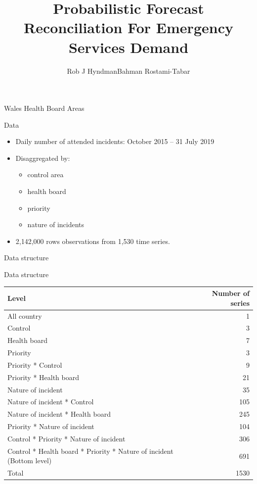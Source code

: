 \documentclass[
  14pt,
  ignorenonframetext,
  aspectratio=169,
]{beamer}
\title{Probabilistic Forecast Reconciliation For Emergency Services
Demand}
\author{Rob J Hyndman\newline Bahman Rostami-Tabar}
\date{}
\providecommand{\tightlist}{%
  \setlength{\itemsep}{0pt}\setlength{\parskip}{0pt}}\usepackage{longtable,booktabs,array}
\begin{document}
\frame{\titlepage}

\begin{frame}{Wales Health Board Areas}
\label{wales-health-board-areas}
\end{frame}

\begin{frame}{Data}
\label{data}
\begin{itemize}
\tightlist
\item
  Daily number of attended incidents: October 2015 -- 31 July
  2019
\item
  Disaggregated by:

  \begin{itemize}
  \tightlist
  \item
    control area
  \item
    health board
  \item
    priority
  \item
    nature of incidents
  \end{itemize}
\item
  2,142,000 rows observations from 1,530 time series.
\end{itemize}
\end{frame}

\begin{frame}{Data structure}
\label{data-structure}
\end{frame}

\begin{frame}{Data structure}
\label{data-structure-1}
\fontsize{10}{11}\sf

\begin{table}
\centering
\begin{tabular}{lr}
\toprule
Level & Number of series\\
\midrule
All country & 1\\
Control & 3\\
Health board & 7\\
Priority & 3\\
Priority * Control & 9\\
Priority * Health board & 21\\
Nature of incident & 35\\
Nature of incident * Control & 105\\
Nature of incident * Health board & 245\\
Priority * Nature of incident & 104\\
Control * Priority * Nature of incident & 306\\
Control * Health board * Priority * Nature of incident (Bottom level) & 691\\
Total & 1530\\
\bottomrule
\end{tabular}
\end{table}
\end{frame}
\end{document}
